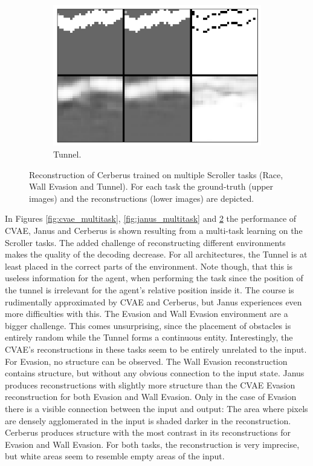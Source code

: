 \begin{figure}[t!]
\begin{subfigure}{0.3\columnwidth}
		\includegraphics[width=\linewidth]{documentation/report/img/cerb_scroll_tunn.png}
		\caption{Tunnel.}
		\label{subfig:cerberus_scroll_tunnel}
	\end{subfigure}

	\caption{Reconstruction of Cerberus trained on multiple Scroller tasks (Race, Wall Evasion and Tunnel). For each task the ground-truth (upper images) and the reconstructions (lower images) are depicted.}
	\label{fig:cerberus_multitask}
\end{figure}

In Figures \ref{fig:cvae_multitask}, \ref{fig:janus_multitask} and \ref{fig:cerberus_multitask} the performance of CVAE, Janus and Cerberus is shown resulting from a multi-task learning on the Scroller tasks. The added challenge of reconstructing different environments makes the quality of the decoding decrease. For all architectures, the Tunnel is at least placed in the correct parts of the environment. Note though, that this is useless information for the agent, when performing the task since the position of the tunnel is irrelevant for the agent's relative position inside it. The course is rudimentally approximated by CVAE and Cerberus, but Janus experiences even more difficulties with this. The Evasion and Wall Evasion environment are a bigger challenge. This comes unsurprising, since the placement of obstacles is entirely random while the Tunnel forms a continuous entity. Interestingly, the CVAE's reconstructions in these tasks seem to be entirely unrelated to the input. For Evasion, no structure can be observed. The Wall Evasion reconstruction contains structure, but without any obvious connection to the input state. Janus produces reconstructions with slightly more structure than the CVAE Evasion reconstruction for both Evasion and Wall Evasion. Only in the case of Evasion there is a visible connection between the input and output: The area where pixels are densely agglomerated in the input is shaded darker in the reconstruction. Cerberus produces structure with the most contrast in its reconstructions for Evasion and Wall Evasion. For both tasks, the reconstruction is very imprecise, but white areas seem to resemble empty areas of the input.

